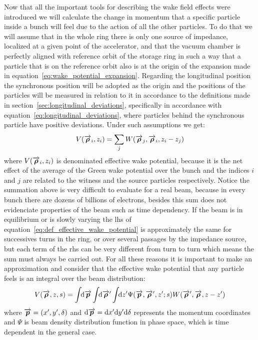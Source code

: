     Now that all the important tools for describing the wake field effects were introduced we will calculate the change in momentum that a specific particle inside a bunch will feel due to the action of all the other particles. To do that we will assume that in the whole ring there is only one source of impedance, localized at a given point of the accelerator, and that the vacuum chamber is perfectly aligned with reference orbit of the storage ring in such a way that a particle that is on the reference orbit also is at the origin of the expansion made in equation~\eqref{eq:wake_potential_expansion}. Regarding the longitudinal position the synchronous position will be adopted as the origin and the positions of the particles will be measured in relation to it in accordance to the definitions made in section~\ref{sec:longitudinal_deviations}, specifically in accordance with equation~\ref{eq:longitudinal_deviations}, where particles behind the synchronous particle have positive deviations. Under such assumptions we get:
    \begin{align}\label{eq:def_effective_wake_potential}
  	    V(\overrightarrow{\boldsymbol{\rho}}_i, z_i) = \sum_j W(\overrightarrow{\boldsymbol{\rho}}_j,\overrightarrow{\boldsymbol{\rho}}_i,z_i-z_j)
    \end{align}
    where $V(\overrightarrow{\boldsymbol{\rho}}_i, z_i)$ is denominated effective wake potential, because it is the net effect of the average of the Green wake potential over the bunch and the indices $i$ and $j$ are related to the witness and the source particles respectively. Notice the summation above is very difficult to evaluate for a real beam, because in every bunch there are dozens of billions of electrons, besides this sum does not evidenciate properties of the beam such as time dependency. If the beam is in equilibrium or is slowly varying the \gls{lhs} of equation~\ref{eq:def_effective_wake_potential} is approximately the same for successives turns in the ring, or over several passages by the impedance source, but each term of the \gls{rhs} can be very different from turn to turn which means the sum must always be carried out. For all these reasons it is important to make an approximation and consider that the effective wake potential that any particle feels is an integral over the beam distribution:
    \begin{align}\label{eq:int_effective_wake_potential}
  	  	V(\overrightarrow{\boldsymbol{\rho}}, z, s) = \int\!\!\text{d}\overrightarrow{\boldsymbol{p}} \int\!\!\text{d}\overrightarrow{\boldsymbol{\rho}}' \int\!\!\text{d}z' 
	  			\Psi(\overrightarrow{\boldsymbol{p}},\overrightarrow{\boldsymbol{\rho}}',z'; s) W(\overrightarrow{\boldsymbol{\rho}}',\overrightarrow{\boldsymbol{\rho}},z-z')
    \end{align}
    where $\overrightarrow{\boldsymbol{p}} = (x', y', \delta)$ and $\text{d}\overrightarrow{\boldsymbol{p}} = \text{d}x'\text{d}y'\text{d}\delta$ represents the momentum coordinates and $\Psi$ is beam density distribution function in phase space, which is time dependent in the general case.

